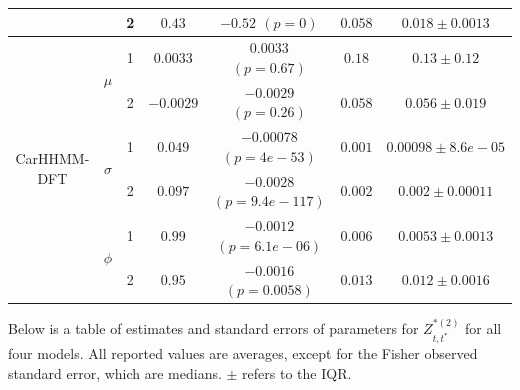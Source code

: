 \documentclass[12pt]{TD-CJS}
\begin{document}
{\begin{tabular}{ccccccc}
                            &                               & 2                                & $0.43$                         & $-0.52$ $(p=0)$          & $0.058$                             & $0.018 \pm 0.0013$                             \\ \hline
\multirow{6}{*}{CarHHMM-DFT}& \multirow{2}{*}{$\mu$}        & 1                                & $0.0033$                         & $0.0033$ $(p=0.67)$          & $0.18$                             & $0.13 \pm 0.12$                             \\
                            &                               & 2                                & $-0.0029$                         & $-0.0029$ $(p=0.26)$          & $0.058$                             & $0.056 \pm 0.019$                             \\
                            & \multirow{2}{*}{$\sigma$}     & 1                                & $0.049$                         & $-0.00078$ $(p=4e-53)$          & $0.001$                             & $0.00098 \pm 8.6e-05$                             \\
                            &                               & 2                                & $0.097$                         & $-0.0028$ $(p=9.4e-117)$          & $0.002$                             & $0.002 \pm 0.00011$                             \\ 
                            & \multirow{2}{*}{$\phi$}       & 1                                & $0.99$                         & $-0.0012$ $(p=6.1e-06)$          & $0.006$                             & $0.0053 \pm 0.0013$                             \\
                            &                               & 2                                & $0.95$                         & $-0.0016$ $(p=0.0058)$          & $0.013$                             & $0.012 \pm 0.0016$                             \\ \hline
\end{tabular}
}


\newpage
Below is a table of estimates and standard errors of parameters for $Z^{*(2)}_{t,t^*}$ for all four models. All reported values are averages, except for the Fisher observed standard error, which are medians. $\pm$ refers to the IQR.
\vspace{1cm}
\end{document}
